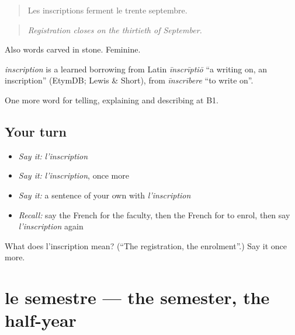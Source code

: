 \begin{quote}
Les inscriptions ferment le trente septembre.
\end{quote}

\begin{quote}
\emph{Registration closes on the thirtieth of September.}
\end{quote}

Also words carved in stone. Feminine.

\begin{cousinweb}
\emph{inscription} is a learned borrowing from Latin \emph{īnscrīptiō} \textquotedblleft{}a writing on, an inscription\textquotedblright{} (EtymDB; Lewis \& Short), from \emph{īnscrībere} \textquotedblleft{}to write on\textquotedblright{}.
\end{cousinweb}

\begin{grammarlens}[title={What you've built}]
One more word for telling, explaining and describing at B1.
\end{grammarlens}

\subsection*{Your turn}
\begin{itemize}
\raggedright
  \item \emph{Say it:} \emph{l'inscription}
  \item \emph{Say it:} \emph{l'inscription}, once more
  \item \emph{Say it:} a sentence of your own with \emph{l'inscription}
  \item \emph{Recall:} say the French for the faculty, then the French for to enrol, then say \emph{l'inscription} again
\end{itemize}

\begin{tcolorbox}[breakable,colback=teal!4,colframe=teal!35!black,title={Before you move on}]
What does l'inscription mean? (\textquotedblleft{}The registration, the enrolment\textquotedblright{}.) Say it once more.
\end{tcolorbox}
\section[le semestre]{le semestre — the semester, the half-year}

\label{lesson:FR-C376-semestre}



